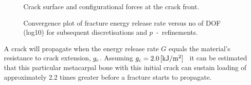 \documentclass[onecolumn]{svjour3}
\begin{document}
\begin{figure}[h!]
	\centering
	\def\svgwidth{7cm}
	
	\caption{Crack surface and configurational forces at the crack front.}
	\label{fig:crackfrontforce}
\end{figure}

\begin{figure}[h!]
	\centering
	
	\caption{Convergence plot of fracture energy release rate versus no of DOF (log10) for subsequent discretisations and $p$~-~refinements.}
	\label{fig:max_g1_convergece}
\end{figure}
A crack will propagate when the energy release rate $G$ equals the material's resistance to crack extension, $g_{\rm c}$. Assuming $g_{\rm c} = 2.0\,[\mathrm{ kJ/m^2}]$~\cite{gasser2007numerical} it can be estimated that this particular metacarpal bone with this initial crack can sustain loading of approximately 2.2 times greater before a fracture starts to propagate. 
\end{document}

